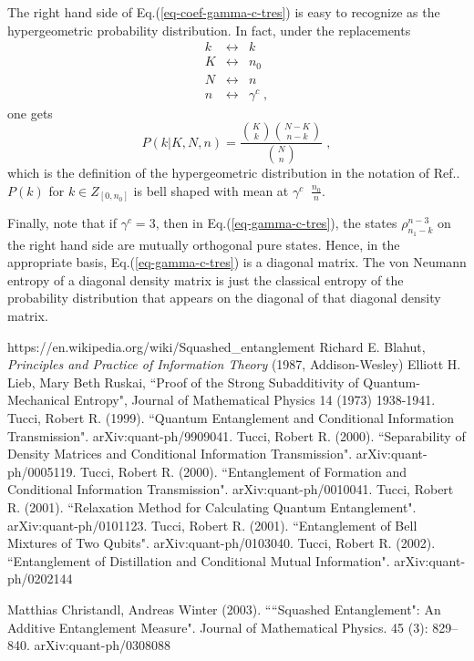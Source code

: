 \documentclass[12pt]{article}%
\newcommand{\beq}{\begin{equation}}
\newcommand{\eeq}{\end{equation}}
\newcommand{\beqa}{\begin{eqnarray}}
\newcommand{\eeqa}{\end{eqnarray}}
\begin{document}
{The right hand side of Eq.(\ref{eq-coef-gamma-c-tres})
is easy to recognize as the hypergeometric
probability distribution. In fact, under the
replacements
\beqa
k&\leftrightarrow&k
\\
K&\leftrightarrow&n_0
\\
N&\leftrightarrow&n
\\
n&\leftrightarrow&\gamma^c
\;,
\eeqa
one gets
\beq
P(k| K, N, n) =
\frac{{K\choose k}{N-K \choose n-k}}{{N\choose n}}
\;,
\eeq
which is the definition of the
hypergeometric distribution in
the notation of Ref.\cite{wiki-hypergeo}.
$P(k)$ for $k \in Z_{[0, n_0]}$
 is bell shaped with mean at $\gamma^c\;\;\frac{n_0}{n}$.

Finally, note that
if $\gamma^c=3$, then in Eq.(\ref{eq-gamma-c-tres}),
the states
$\rho^{n-3}_{n_1-k}$ on the right hand side are
mutually orthogonal pure states.
Hence, in the appropriate
basis,  Eq.(\ref{eq-gamma-c-tres})
is a diagonal matrix.
The von Neumann entropy of
a diagonal density matrix is
just
the classical entropy of
the probability distribution
that appears on the diagonal
of that diagonal density matrix.



\begin{thebibliography}{99}
https://en.wikipedia.org/wiki/Squashed\_entanglement
Richard E. Blahut, {\it Principles and Practice of Information Theory} (1987, Addison-Wesley)
 Elliott H. Lieb, Mary Beth Ruskai, ``Proof of the Strong Subadditivity of Quantum-Mechanical Entropy", Journal of Mathematical Physics 14 (1973) 1938-1941.
 Tucci, Robert R. (1999). ``Quantum Entanglement and Conditional Information Transmission". arXiv:quant-ph/9909041.
 Tucci, Robert R. (2000). ``Separability of Density Matrices and Conditional Information Transmission". arXiv:quant-ph/0005119.
 Tucci, Robert R. (2000). ``Entanglement of Formation and Conditional Information Transmission". arXiv:quant-ph/0010041.
 Tucci, Robert R. (2001). ``Relaxation Method for Calculating Quantum Entanglement". arXiv:quant-ph/0101123.
 Tucci, Robert R. (2001). ``Entanglement of Bell Mixtures of Two Qubits". arXiv:quant-ph/0103040.
 Tucci, Robert R. (2002). ``Entanglement of Distillation and Conditional Mutual Information". arXiv:quant-ph/0202144

 Matthias Christandl, Andreas Winter (2003). ````Squashed Entanglement": An Additive Entanglement Measure". Journal of Mathematical Physics. 45 (3): 829–840. arXiv:quant-ph/0308088


\end{thebibliography}}
\end{document}
